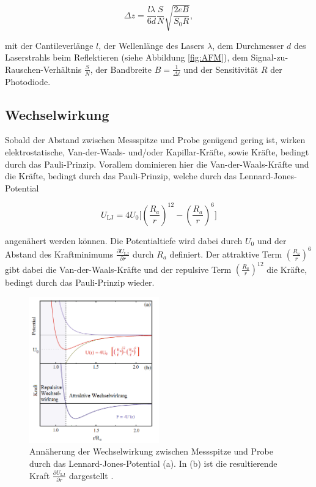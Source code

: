 \begin{equation}
  \Delta z = \frac{l \lambda}{6 d} \frac{S}{N} \sqrt{\frac{2eB}{S_0 R}},
  \label{eq:F3}
\end{equation}

\noindent
mit der Cantileverlänge $l$, der Wellenlänge des Lasers $\lambda$, dem Durchmesser
$d$ des Laserstrahls beim Reflektieren (siehe Abbildung \ref{fig:AFM}),
dem Signal-zu-Rauschen-Verhältnis $\frac{S}{N}$, der Bandbreite
$B=\frac{1}{\Delta t}$ und der Sensitivität $R$ der Photodiode.

\subsection{Wechselwirkung}
\label{sec:Wechselwirkung}

Sobald der Abstand zwischen Messspitze und Probe genügend gering ist, wirken
elektrosta{\-}tische, Van-der-Waals- und/oder Kapillar-Kräfte, sowie Kräfte, bedingt
durch das Pauli-Prinzip. Vorallem dominieren hier die Van-der-Waals-Kräfte und die
Kräfte, bedingt durch das Pauli-Prinzip, welche durch das Lennard-Jones-Potential

\begin{equation}
	U_{\text{LJ}} = 4U_0 \biggl[
		\left(\frac{R_a}{r}\right)^{12} - \left(\frac{R_a}{r}\right)^6
	\biggr]
	\label{eg:F4}
\end{equation}

\noindent
angenähert werden können. Die Potentialtiefe wird dabei durch $U_0$
und der Abstand des Kraftminimums $\frac{\partial U_{\text{LJ}}}{\partial r}$
durch $R_a$ definiert. Der attraktive Term $\left(\frac{R_a}{r}\right)^6$
gibt dabei die Van-der-Waals-Kräfte und der repulsive Term
$\left(\frac{R_a}{r}\right)^{12}$ die Kräfte, bedingt durch das Pauli-Prinzip
wieder.

\begin{figure}[H]
	\centering
	\includegraphics[width=0.5\textwidth]{Abb/LJ.png}
	\caption{Annäherung der Wechselwirkung zwischen Messspitze und Probe durch
	das Lennard-Jones-Potential (a). In (b) ist die resultierende Kraft
	$\frac{\partial U_{\text{LJ}}}{\partial r}$ dargestellt \cite[148]{AFM}.}
	\label{fig:LJ}
\end{figure}

